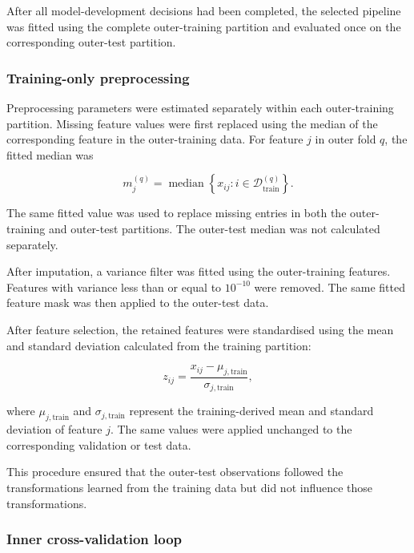 \documentclass[12pt,twocolumn]{article}
\begin{document}
After all model-development decisions had been completed, the selected
pipeline was fitted using the complete outer-training partition and
evaluated once on the corresponding outer-test partition.

\subsubsection{Training-only preprocessing}
\label{subsubsec:training_preprocessing}

Preprocessing parameters were estimated separately within each
outer-training partition. Missing feature values were first replaced
using the median of the corresponding feature in the outer-training
data. For feature \(j\) in outer fold \(q\), the fitted median was

\begin{equation}
m^{(q)}_j
=
\operatorname{median}
\left\{
x_{ij}:
i\in\mathcal{D}^{(q)}_{\mathrm{train}}
\right\}.
\label{eq:training_median}
\end{equation}

The same fitted value was used to replace missing entries in both the
outer-training and outer-test partitions. The outer-test median was not
calculated separately.

After imputation, a variance filter was fitted using the outer-training
features. Features with variance less than or equal to \(10^{-10}\)
were removed. The same fitted feature mask was then applied to the
outer-test data.

After feature selection, the retained features were standardised using
the mean and standard deviation calculated from the training
partition:

\begin{equation}
z_{ij}
=
\frac{x_{ij}-\mu_{j,\mathrm{train}}}
{\sigma_{j,\mathrm{train}}},
\label{eq:training_standardisation}
\end{equation}

where \(\mu_{j,\mathrm{train}}\) and
\(\sigma_{j,\mathrm{train}}\) represent the training-derived mean and
standard deviation of feature \(j\). The same values were applied
unchanged to the corresponding validation or test data.

This procedure ensured that the outer-test observations followed the
transformations learned from the training data but did not influence
those transformations.

\subsubsection{Inner cross-validation loop}
\label{subsubsec:inner_cv}
\end{document}
